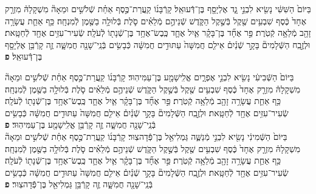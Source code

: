 \documentclass[twoside, openany, parskip=half, 11pt]{book}
\begin{document}
\begin{sometimes}
\begin{footnotesize}
\begin{multicols}{2}

בַּיּוֹם֙ הַשִּׁשִּׁ֔י נָשִׂ֖יא לִבְנֵ֣י גָ֑ד אֶלְיָסָ֖ף בֶּן־דְּֿֿעוּאֵֽל׃ קָרְֿבָּנ֜וֹ קַֽעֲרַת־כֶּ֣סֶף אַחַ֗ת שְֿׁלֹשִׁ֣ים וּמֵאָה֘ מִשְׁקָלָהּ֒ מִזְרָ֤ק אֶחָד֙ כֶּ֔סֶף שִׁבְעִ֥ים שֶׁ֖קֶל בְּֿשֶׁ֣קֶל הַקֹּ֑דֶשׁ שְֿׁנֵיהֶ֣ם מְֿלֵאִ֗ים סֹ֛לֶת בְּֿלוּלָ֥ה בַשֶּׁ֖מֶן לְֿמִנְחָֽה׃ כַּ֥ף אַחַ֛ת עֲשָׂרָ֥ה זָהָ֖ב מְֿלֵאָ֥ה קְֿטֹֽרֶת׃ פַּ֣ר אֶחָ֞ד בֶּן־בָּקָ֗ר אַ֧יִל אֶחָ֛ד כֶּֽבֶשׂ־אֶחָ֥ד בֶּן־שְֿׁנָת֖וֹ לְֿעֹלָֽה׃ שְֿׂעִיר־עִזִּ֥ים אֶחָ֖ד לְֿחַטָּֽאת׃ וּלְזֶ֣בַֽח הַשְּֿׁלָמִים֘ בָּקָ֣ר שְֿׁנַ֒יִם֒ אֵילִ֤ם חֲמִשָּׁה֙ עַתּוּדִ֣ים חֲמִשָּׁ֔ה כְּֿבָשִׂ֥ים בְּֿנֵֽי־שָׁנָ֖ה חֲמִשָּׁ֑ה זֶ֛ה קָרְֿבַּ֥ן אֶלְיָסָ֖ף בֶּן־דְּֿֿעוּאֵֽל׃ \textbf{פ}


בַּיּוֹם֙ הַשְּֿׁבִיעִ֔י נָשִׂ֖יא לִבְנֵ֣י אֶפְרָ֑יִם אֱלִֽישָׁמָ֖ע בֶּן־עַמִּיהֽוּד׃ קָרְֿבָּנ֜וֹ קַֽעֲרַת־כֶּ֣סֶף אַחַ֗ת שְֿׁלֹשִׁ֣ים וּמֵאָה֘ מִשְׁקָלָהּ֒ מִזְרָ֤ק אֶחָד֙ כֶּ֔סֶף שִׁבְעִ֥ים שֶׁ֖קֶל בְּֿשֶׁ֣קֶל הַקֹּ֑דֶשׁ שְֿׁנֵיהֶ֣ם מְֿלֵאִ֗ים סֹ֛לֶת בְּֿלוּלָ֥ה בַשֶּׁ֖מֶן לְֿמִנְחָֽה׃ כַּ֥ף אַחַ֛ת עֲשָׂרָ֥ה זָהָ֖ב מְֿלֵאָ֥ה קְֿטֹֽרֶת׃  פַּ֣ר אֶחָ֞ד בֶּן־בָּקָ֗ר אַ֧יִל אֶחָ֛ד כֶּֽבֶשׂ־אֶחָ֥ד בֶּן־שְֿׁנָת֖וֹ לְֿעֹלָֽה׃ שְֿׂעִיר־עִזִּ֥ים אֶחָ֖ד לְֿחַטָּֽאת׃ וּלְזֶ֣בַֽח הַשְּֿׁלָמִים֘ בָּקָ֣ר שְֿׁנַ֒יִם֒ אֵילִ֤ם חֲמִשָּׁה֙ עַתּוּדִ֣ים חֲמִשָּׁ֔ה כְּֿבָשִׂ֥ים בְּֿנֵֽי־שָׁנָ֖ה חֲמִשָּׁ֑ה זֶ֛ה קָרְֿבַּ֥ן אֱלִֽישָׁמָ֖ע בֶּן־עַמִּיהֽוּד׃ \textbf{פ}
 \\
 בַּיּוֹם֙ הַשְּֿׁמִינִ֔י נָשִׂ֖יא לִבְנֵ֣י מְֿנַשֶּׁ֑ה גַּמְלִיאֵ֖ל בֶּן־פְּֿֿדָהצֽוּר׃ קָרְֿבָּנ֜וֹ קַֽעֲרַת־כֶּ֣סֶף אַחַ֗ת שְֿׁלֹשִׁ֣ים וּמֵאָה֘ מִשְׁקָלָהּ֒ מִזְרָ֤ק אֶחָד֙ כֶּ֔סֶף שִׁבְעִ֥ים שֶׁ֖קֶל בְּֿשֶׁ֣קֶל הַקֹּ֑דֶשׁ שְֿׁנֵיהֶ֣ם מְֿלֵאִ֗ים סֹ֛לֶת בְּֿלוּלָ֥ה בַשֶּׁ֖מֶן לְֿמִנְחָֽה׃ כַּ֥ף אַחַ֛ת עֲשָׂרָ֥ה זָהָ֖ב מְֿלֵאָ֥ה קְֿטֹֽרֶת׃ פַּ֣ר אֶחָ֞ד בֶּן־בָּקָ֗ר אַ֧יִל אֶחָ֛ד כֶּֽבֶשׂ־אֶחָ֥ד בֶּן־שְֿׁנָת֖וֹ לְֿעֹלָֽה׃ שְֿׂעִיר־עִזִּ֥ים אֶחָ֖ד לְֿחַטָּֽאת׃ וּלְזֶ֣בַֽח הַשְּֿׁלָמִים֘ בָּקָ֣ר שְֿׁנַ֒יִם֒ אֵילִ֤ם חֲמִשָּׁה֙ עַתּוּדִ֣ים חֲמִשָּׁ֔ה כְּֿבָשִׂ֥ים בְּֿנֵֽי־שָׁנָ֖ה חֲמִשָּׁ֑ה זֶ֛ה קָרְֿבַּ֥ן גַּמְלִיאֵ֖ל בֶּן־פְּֿֿדָהצֽוּר׃ \textbf{פ}



\end{multicols}
\end{footnotesize}
\end{sometimes}
\end{document}
